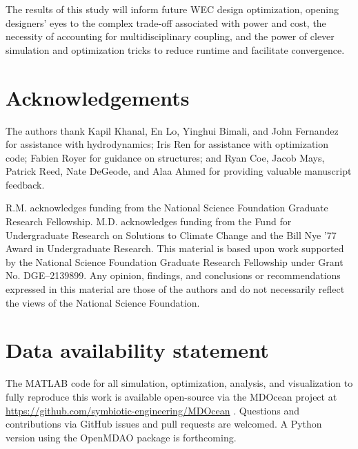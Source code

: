 \documentclass[preprint,12pt]{elsarticle}
\begin{document}
The results of this study will inform future WEC design optimization, opening designers' eyes to the complex trade-off associated with power and cost, the necessity of accounting for multidisciplinary coupling, and the power of clever simulation and optimization tricks to reduce runtime and facilitate convergence.

\section{Acknowledgements}
The authors thank Kapil Khanal, En Lo, Yinghui Bimali, and John Fernandez for assistance with hydrodynamics; Iris Ren for assistance with optimization code; Fabien Royer for guidance on structures; and Ryan Coe, Jacob Mays, Patrick Reed, Nate DeGeode, and Alaa Ahmed for providing valuable manuscript feedback.

R.M. acknowledges funding from the National Science Foundation Graduate Research Fellowship.
M.D. acknowledges funding from the Fund for Undergraduate Research on Solutions to Climate Change and the Bill Nye ’77 Award in Undergraduate Research.
This material is based upon work supported by the National Science Foundation Graduate Research Fellowship under Grant No.
DGE–2139899.
Any opinion, findings, and conclusions or recommendations expressed in this material are those of the authors and do not necessarily reflect the views of the National Science Foundation.

\section{Data availability statement}
The MATLAB code for all simulation, optimization, analysis, and visualization to fully reproduce this work is available open-source via the MDOcean project at \url{https://github.com/symbiotic-engineering/MDOcean} \cite{mccabe_mdocean_2024}.
Questions and contributions via GitHub issues and pull requests are welcomed.
A Python version using the OpenMDAO package is forthcoming. %




\end{document}
